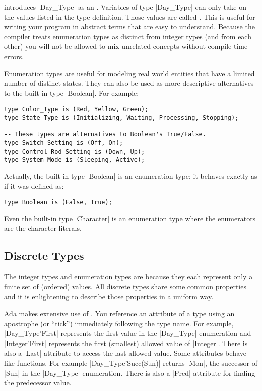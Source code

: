 \noindent introduces |Day_Type| as an . Variables of type |Day_Type|
can only take on the values listed in the type definition. Those values are called
. This is useful for writing your program in abstract terms that are easy
to understand. Because the compiler treats enumeration types as distinct from integer types (and
from each other) you will not be allowed to mix unrelated concepts without compile time errors.

Enumeration types are useful for modeling real world entities that have a limited number of
distinct states. They can also be used as more descriptive alternatives to the built-in type
|Boolean|. For example:

\begin{lstlisting}
type Color_Type is (Red, Yellow, Green);
type State_Type is (Initializing, Waiting, Processing, Stopping);

-- These types are alternatives to Boolean's True/False.
type Switch_Setting is (Off, On);
type Control_Rod_Setting is (Down, Up);
type System_Mode is (Sleeping, Active);
\end{lstlisting}

Actually, the built-in type |Boolean| is an enumeration type; it behaves exactly as if it was
defined as:

\begin{lstlisting}
type Boolean is (False, True);
\end{lstlisting}

\noindent Even the built-in type |Character| is an enumeration type where the enumerators are
the character literals.

\subsection{Discrete Types}

The integer types and enumeration types are  because they each represent
only a finite set of (ordered) values. All discrete types share some common properties and it is
enlightening to describe those properties in a uniform way.

Ada makes extensive use of . You reference an attribute of a type using an
apostrophe (or ``tick'') immediately following the type name. For example, |Day_Type'First|
represents the first value in the |Day_Type| enumeration and |Integer'First| represents the
first (smallest) allowed value of |Integer|. There is also a |Last| attribute to access the last
allowed value. Some attributes behave like functions. For example |Day_Type'Succ(Sun)| returns
|Mon|, the successor of |Sun| in the |Day_Type| enumeration. There is also a |Pred| attribute
for finding the predecessor value.

